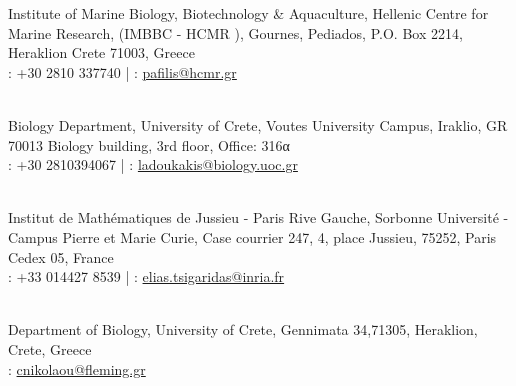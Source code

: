 \documentclass[
	a4paper,
]{fortysecondscv}
\begin{document}
\begin{cvtable}

	    {Institute of Marine Biology, Biotechnology \& Aquaculture, Hellenic Centre for Marine Research, (IMBBC - HCMR
	    ),
	    Gournes, Pediados, P.O. Box 2214, Heraklion Crete 71003, Greece \\ \faPhone: +30 2810 337740 | 
	    \faAt: \href{mailto:pafilis@hcmr.gr}{pafilis@hcmr.gr}}
	    
	\\
	  
	    {Biology Department, University of Crete,
	    Voutes University Campus, Iraklio, GR 70013 Biology building, 3rd floor, Office: 316α 
	    \\ 
	    \faPhone: +30 2810394067 | 
	    \faAt: \href{mailto:ladoukakis@biology.uoc.gr}{ladoukakis@biology.uoc.gr}}
	  
	\\ 

    
	    {Institut de Mathématiques de Jussieu - Paris Rive Gauche, Sorbonne Université - Campus Pierre et Marie Curie, Case courrier 247, 4, place Jussieu, 75252, Paris Cedex 05, France \\ 
	    \faPhone: +33 014427 8539 | \faAt: \href{mailto: elias.tsigaridas@inria.fr}{elias.tsigaridas@inria.fr}}

    \\

	    {Department of Biology, University of Crete, Gennimata 34,71305, Heraklion, Crete, Greece \\ 
	    \faAt: \href{mailto:cnikolaou@fleming.gr}{cnikolaou@fleming.gr}}


\end{cvtable}





\end{document}
